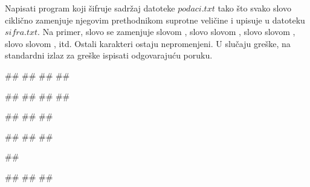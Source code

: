\begin{Exercise}[label=p3_id17]         
Napisati program koji šifruje sadržaj datoteke $podaci.txt$ tako što svako slovo ciklično 
zamenjuje njegovim prethodnikom suprotne veličine i upisuje u datoteku $sifra.txt$. 
Na primer, slovo  se zamenjuje slovom , slovo 
 slovom , slovo  slovom , slovo  slovom 
, itd. Ostali karakteri ostaju nepromenjeni. 
U slučaju greške, na standardni izlaz za greške ispisati odgovarajuću poruku.

\begin{minitest}
\begin{upotreba}{1}
##
##
##
##

##
##
##
##
\end{upotreba}
\end{minitest}
\begin{minitest}
\begin{upotreba}{2}
##
##
##

##
##
##
\end{upotreba}
\end{minitest}
\begin{minitest}
\begin{upotreba}{3}
##

#\naslovIzlazZaGresku#
##
##
\end{upotreba}
\end{minitest}
\end{Exercise}
\begin{Answer}[ref=p3_id17]
\end{Answer}



